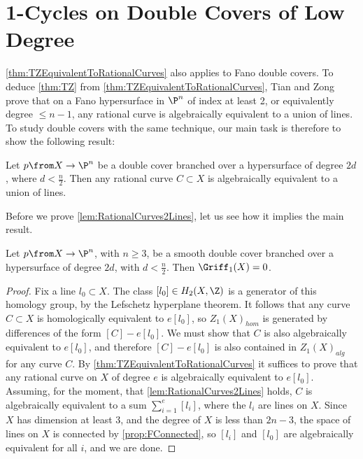 
\section{1-Cycles on Double Covers of Low Degree}
\cref{thm:TZEquivalentToRationalCurves} also applies to Fano double covers. To deduce \cref{thm:TZ} from \cref{thm:TZEquivalentToRationalCurves}, Tian and Zong prove that on a Fano hypersurface in $\P^n$ of index at least 2, or equivalently degree $\leq n-1$, any rational curve is algebraically equivalent to a union of lines. To study double covers with the same technique, our main task is therefore to show the following result:
\begin{lemma}
  \label{lem:RationalCurves2Lines}
  Let $p \from X \to \P^n$ be a double cover branched over a hypersurface of degree $2d$, where $d < \frac{n}{2}$. Then any rational curve $C \subset X$ is algebraically equivalent to a union of lines.
\end{lemma}

Before we prove \cref{lem:RationalCurves2Lines}, let us see how it implies the main result.
\begin{theorem}
  \label{thm:GriffTrivial}
  Let $p \from X \to \P^n$, with $n \geq 3$, be a smooth double cover branched over a hypersurface of degree $2d$, with $d < \frac{n}{2}$. Then $\Griff_1(X) = 0$.
\end{theorem}
\begin{proof}
  Fix a line $l_0 \subset X$. The class $[l_0] \in H_2(X,\Z)$ is a generator of this homology group, by the Lefschetz hyperplane theorem. It follows that any curve $C \subset X$ is homologically equivalent to $e[l_0]$, so $Z_1(X)_{hom}$ is generated by differences of the form $[C]-e[l_0]$. We must show that $C$ is also algebraically equivalent to $e[l_0]$, and therefore $[C]-e[l_0]$ is also contained in $Z_1(X)_{alg}$ for any curve $C$. By \cref{thm:TZEquivalentToRationalCurves} it suffices to prove that any rational curve on $X$ of degree $e$ is algebraically equivalent to $e[l_0]$. Assuming, for the moment, that \cref{lem:RationalCurves2Lines} holds, $C$ is algebraically equivalent to a sum $\sum_{i=1}^e[l_i]$, where the $l_i$ are lines on $X$. Since $X$ has dimension at least 3, and the degree of $X$ is less than $2n-3$, the space of lines on $X$ is connected by \cref{prop:FConnected}, so $[l_i]$ and $[l_0]$ are algebraically equivalent for all $i$, and we are done.
\end{proof}

